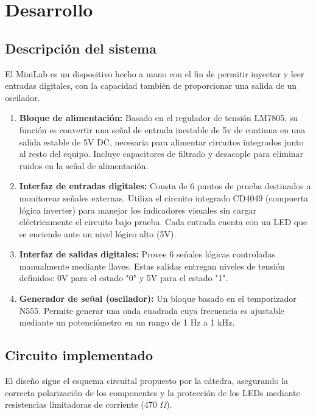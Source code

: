 \documentclass[12pt,a4paper]{article}
\begin{document}
\section{Desarrollo}

\subsection{Descripción del sistema}
El MiniLab es un dispositivo hecho a mano con el fin de permitir inyectar y leer entradas digitales, con la capacidad también de proporcionar una salida de un oscilador.

\begin{enumerate}
	\item \textbf{Bloque de alimentación:} Basado en el regulador de tensión LM7805, su función es convertir una señal de entrada inestable de 5v de continua en una salida estable de 5V DC, necesaria para alimentar circuitos integrados junto al resto del equipo. Incluye capacitores de filtrado y desacople para eliminar ruidos en la señal de alimentación.
	
	\item \textbf{Interfaz de entradas digitales:} Consta de 6 puntos de prueba destinados a monitorear señales externas. Utiliza el circuito integrado CD4049 (compuerta lógica inverter) para manejar los indicadores visuales sin cargar eléctricamente el circuito bajo prueba. Cada entrada cuenta con un LED que se enciende ante un nivel lógico alto (5V).
	
	\item \textbf{Interfaz de salidas digitales:} Provee 6 señales lógicas controladas manualmente mediante llaves. Estas salidas entregan niveles de tensión definidos: 0V para el estado "0" y 5V para el estado "1".
	
	\item \textbf{Generador de señal (oscilador):} Un bloque basado en el temporizador N555. Permite generar una onda cuadrada cuya frecuencia es ajustable mediante un potenciómetro en un rango de 1 Hz a 1 kHz.
\end{enumerate}
	
\subsection{Circuito implementado}
El diseño sigue el esquema circuital propuesto por la cátedra, asegurando la correcta polarización de los componentes y la protección de los LEDs mediante resistencias limitadoras de corriente (470 $\Omega$). 
\end{document}

